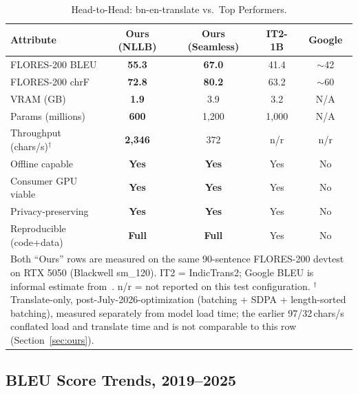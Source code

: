 \documentclass[conference]{IEEEtran}
\begin{document}
\begin{table}[t]
  \centering
  \caption{Head-to-Head: bn-en-translate vs.\ Top Performers.}
  \label{tab:headtohead}
  \small
  \setlength{\tabcolsep}{3pt}
  \begin{tabular}{p{2.6cm} c c c c}
    \toprule
    \textbf{Attribute}         & \textbf{Ours (NLLB)} & \textbf{Ours (Seamless)} & \textbf{IT2-1B} & \textbf{Google} \\
    \midrule
    FLORES-200 BLEU            & \textbf{55.3}  & \textbf{67.0}  & 41.4      & $\sim$42 \\
    FLORES-200 chrF            & \textbf{72.8}  & \textbf{80.2}  & 63.2      & $\sim$60 \\
    VRAM (GB)                  & \textbf{1.9}   & 3.9            & 3.2       & N/A \\
    Params (millions)          & \textbf{600}   & 1,200          & 1,000     & N/A \\
    Throughput (chars/s)$^\dagger$ & \textbf{2{,}346} & 372          & n/r       & n/r \\
    Offline capable            & \textbf{Yes}   & \textbf{Yes}   & Yes       & No  \\
    Consumer GPU viable        & \textbf{Yes}   & \textbf{Yes}   & Yes       & No  \\
    Privacy-preserving         & \textbf{Yes}   & \textbf{Yes}   & Yes       & No  \\
    Reproducible (code+data)   & \textbf{Full}  & \textbf{Full}  & Yes       & No  \\
    \bottomrule
    \multicolumn{5}{p{8.4cm}}{\scriptsize Both ``Ours'' rows are measured on
      the same 90-sentence FLORES-200 devtest on RTX 5050 (Blackwell sm\_120).
      IT2 = IndicTrans2; Google BLEU is informal estimate from~\cite{nllb2022}.
      n/r = not reported on this test configuration.
      $^\dagger$ Translate-only, post-July-2026-optimization (batching + SDPA +
      length-sorted batching), measured separately from model load time; the
      earlier 97/32\,chars/s conflated load and translate time and is not
      comparable to this row (Section~\ref{sec:ours}).}
  \end{tabular}
\end{table}

\subsection{BLEU Score Trends, 2019--2025}
\end{document}
